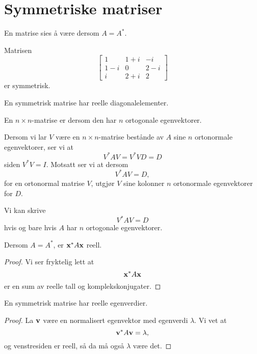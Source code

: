 \section*{Symmetriske matriser}
En matrise sies å være 
 dersom $A=A^*$.

\begin{ex}
Matrisen
\[
\begin{bmatrix}
1 & 1+i & -i\\  1-i &0 & 2-i \\ i & 2+i  & 2
\end{bmatrix}
\]
er symmetrisk.
\end{ex}

\begin{merkx}
En symmetrisk matrise har reelle diagonalelementer.
\end{merkx}

\begin{defnx}
En $n \times n$-matrise er  dersom den har $n$ ortogonale egenvektorer.
\end{defnx}

Dersom vi lar $V$ være en $n \times n$-matrise bestånde av $A$ sine $n$ ortonormale egenvektorer, 
ser vi at 
\[
V^* A V =V^* VD =D
\]
siden $V^* V=I$. Motsatt ser vi at dersom
\[
V^* A V =D,
\]
for en ortonormal matrise $V$, utgjør $V$ sine kolonner  $n$ ortonormale egenvektorer for $D$.

\begin{thm}
Vi kan skrive 
\[
V^*AV=D
\]
hvis og bare hvis $A$ har $n$ ortogonale egenvektorer. 
\end{thm}


\begin{thm}
Dersom  $A=A^*$, er 
$
\mathbf{x}^* A \mathbf{x}
$
reell.
\end{thm}
\begin{proof}
Vi ser fryktelig lett at
\[
\mathbf{x}^* A \mathbf{x}
\]
er en sum av reelle tall og komplekskonjugater.
\end{proof}


\begin{thm}
En  symmetrisk matrise har reelle egenverdier.
\end{thm}
\begin{proof}
La $\mathbf{v}$ være en normalisert egenvektor med egenverdi $\lambda$. Vi vet at 
\[
\mathbf{v}^* A \mathbf{v}=\lambda,
\]
og venstresiden er reell, så da må også $\lambda$ være det.
\end{proof}



